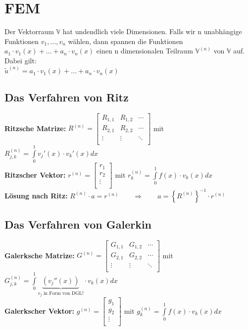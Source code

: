 \clearpage
\section{FEM}

Der Vektorraum $\mathbb{V}$ hat undendlich viele Dimensionen. Falls wir n unabhängige Funktionen $v_1,\ldots,v_n$ wählen, dann spannen die Funktionen $a_1\cdot v_1(x)+\ldots+a_n\cdot v_n(x)$ einen n dimensionalen Teilraum $\mathbb{V}^{(n)}$  von $\mathbb{V}$ auf. Dabei gilt:\\

$\boxed{\tilde{u}^{(n)}=a_1\cdot v_1(x)+\ldots+a_n\cdot v_n(x)}$
\subsection{Das Verfahren von Ritz}
\textbf{Ritzsche Matrize: }
$R^{(n)}=\begin{bmatrix}
	R_{1,1}& R_{1,2}&\cdots\\
	R_{2,1}& R_{2,2}&\cdots\\
	\vdots & \vdots &\ddots\\
\end{bmatrix}$ \qquad mit \qquad $R_{j,k}^{(n)}=\int\limits_{0}^{1}{v_j'(x)\cdot
v_k'(x) dx}$\\
\textbf{Ritzscher Vektor: } 
$r^{(n)}=\begin{bmatrix}
	r_1\\
	r_2\\
	\vdots\\
\end{bmatrix}$ \qquad mit \qquad $r_{k}^{(n)}=\int\limits_{0}^{1}{f(x)\cdot v_k(x) dx}$\\

\textbf{Lösung nach Ritz:} $R^{(n)}\cdot a=r^{(n)}\qquad \Rightarrow \qquad a=\left\{R^{(n)}\right\}^{-1}\cdot r^{(n)}$
\subsection{Das Verfahren von Galerkin}
\textbf{Galerksche Matrize: }
$G^{(n)}=\begin{bmatrix}
	G_{1,1}& G_{1,2}&\cdots\\
	G_{2,1}& G_{2,2}&\cdots\\
	\vdots & \vdots &\ddots\\
\end{bmatrix}$ \qquad mit \qquad $G_{j,k}^{(n)}=\int\limits_{0}^{1}{\underbrace{(v_j''(x))}_{v_j \text{ in Form von DGL!}}\cdot v_k(x) dx}$\\
\textbf{Galerkscher Vektor: } 
$g^{(n)}=\begin{bmatrix}
	g_1\\
	g_2\\
	\vdots\\
\end{bmatrix}$ \qquad mit \qquad $g_{k}^{(n)}=\int\limits_{0}^{1}{f(x)\cdot v_k(x) dx}$\\

